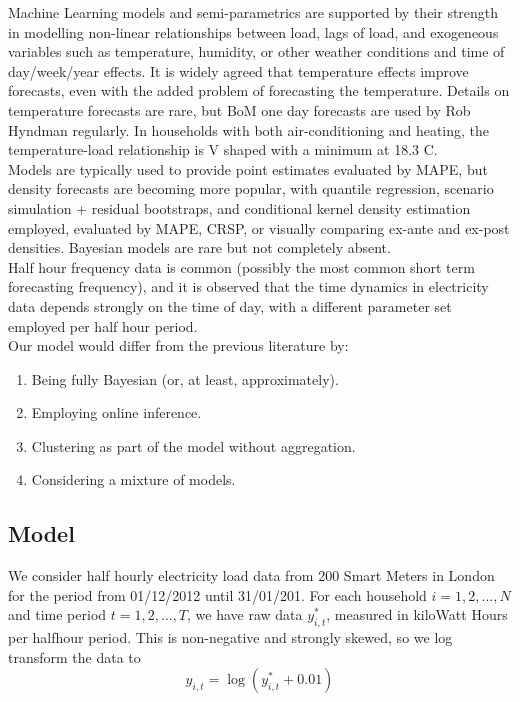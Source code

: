 \documentclass[12pt,a4paper]{article}\usepackage[]{graphicx}\usepackage[]{color}
\begin{document}
Machine Learning models and semi-parametrics are supported by their strength in modelling non-linear relationships between load, lags of load, and exogeneous variables such as temperature, humidity, or other weather conditions and time of day/week/year effects. It is widely agreed that temperature effects improve forecasts, even with the added problem of forecasting the temperature. Details on temperature forecasts are rare, but BoM one day forecasts are used by Rob Hyndman regularly. In households with both air-conditioning and heating, the temperature-load relationship is V shaped with a minimum at 18.3 C.
\\

Models are typically used to provide point estimates evaluated by MAPE, but density forecasts are becoming more popular, with quantile regression, scenario simulation + residual bootstraps, and conditional kernel density estimation employed, evaluated by MAPE, CRSP, or visually comparing ex-ante and ex-post densities. Bayesian models are rare but not completely absent.
\\

Half hour frequency data is common (possibly the most common short term forecasting frequency), and it is observed that the time dynamics in electricity data depends strongly on the time of day, with a different parameter set employed per half hour period.
\\

Our model would differ from the previous literature by:
\begin{enumerate}
\item Being fully Bayesian (or, at least, approximately).
\item Employing online inference.
\item Clustering as part of the model without aggregation.
\item Considering a mixture of models.
\end{enumerate}

\subsection{Model}

We consider half hourly electricity load data from 200 Smart Meters in London for the period from 01/12/2012 until 31/01/201. For each household $i = 1, 2, \dots, N$ and time period $t = 1, 2, \dots, T$, we have raw data $y_{i, t}^*$, measured in kiloWatt Hours per halfhour period. This is non-negative and strongly skewed, so we log transform the data to
\begin{equation}
\label{logY}
y_{i, t} = \log(y_{i, t}^* + 0.01)
\end{equation}
\end{document}
